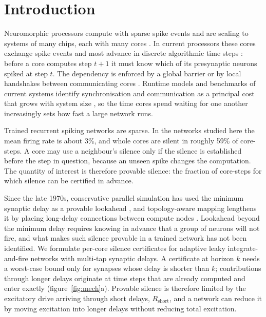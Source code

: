 \documentclass{iopjournal}
\begin{document}
\section{Introduction}

Neuromorphic processors compute with sparse spike events and are scaling to systems of many chips, each with many cores \cite{kudithipudi2025,schuman2022}. In current processors these cores exchange spike events and most advance in discrete algorithmic time steps \cite{spinnaker,loihi,spinnaker2chip,darwin3}: before a core computes step $t+1$ it must know which of its presynaptic neurons spiked at step $t$. The dependency is enforced by a global barrier \cite{truenorth,loihi} or by local handshakes between communicating cores \cite{neuroscale,asyncaccel}. Runtime models and benchmarks of current systems identify synchronisation and communication as a principal cost that grows with system size \cite{loihi2runtime,neurobench,golosio2026}, so the time cores spend waiting for one another increasingly sets how fast a large network runs.

Trained recurrent spiking networks are sparse. In the networks studied here the mean firing rate is about 3\%, and whole cores are silent in roughly 59\% of core-steps. A core may use a neighbour's silence only if the silence is established before the step in question, because an unseen spike changes the computation. The quantity of interest is therefore provable silence: the fraction of core-steps for which silence can be certified in advance.

Since the late 1970s, conservative parallel simulation has used the minimum synaptic delay as a provable lookahead \cite{chandymisra,fujimoto,nest}, and topology-aware mapping lengthens it by placing long-delay connections between compute nodes \cite{lober}. Lookahead beyond the minimum delay requires knowing in advance that a group of neurons will not fire, and what makes such silence provable in a trained network has not been identified. We formulate per-core silence certificates for adaptive leaky integrate-and-fire networks with multi-tap synaptic delays. A certificate at horizon $k$ needs a worst-case bound only for synapses whose delay is shorter than $k$; contributions through longer delays originate at time steps that are already computed and enter exactly (figure~\ref{fig:mech}a). Provable silence is therefore limited by the excitatory drive arriving through short delays, $R_{\mathrm{short}}$, and a network can reduce it by moving excitation into longer delays without reducing total excitation.
\end{document}
